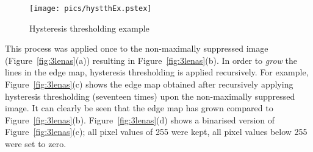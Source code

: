 \documentclass[10pt,twocolumn,letterpaper]{article}
\begin{document}
\begin{figure}[!htb]
\begin{center}
\setlength{\abovecaptionskip}{-0.25cm}
        \texttt{[image: pics/hystthEx.pstex]}
        \caption{Hysteresis thresholding example}
        \label{fig:hystThEx}
\setlength{\abovecaptionskip}{0cm}
\end{center}
\end{figure}

This process was applied once to the non-maximally suppressed image (Figure~\ref{fig:3lenas}(a)) resulting
in Figure~\ref{fig:3lenas}(b). In order to \emph{grow} the lines in the edge map, hysteresis thresholding 
is applied recursively. For example, Figure~\ref{fig:3lenas}(c) shows the edge map obtained after
recursively applying hysteresis thresholding (seventeen times) upon the non-maximally suppressed image.
It can clearly be seen that the edge map has grown compared to Figure~\ref{fig:3lenas}(b). Figure~\ref{fig:3lenas}(d)
shows a binarised version of Figure~\ref{fig:3lenas}(c); all pixel values of 255 were kept, all pixel values below
255 were set to zero.


\renewcommand{\baselinestretch}{1}
	\footnotesize


	\normalsize
\renewcommand{\baselinestretch}{1}
\end{document}
